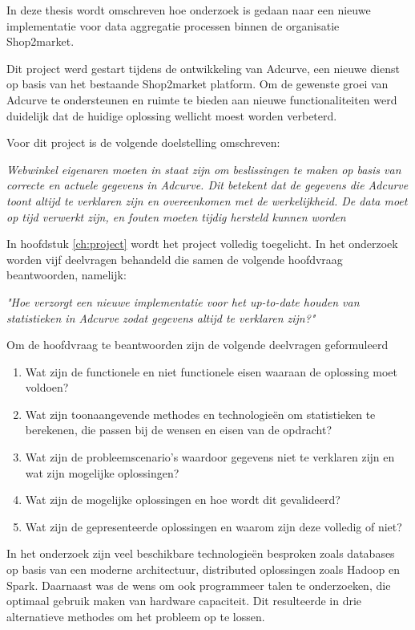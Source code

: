 
In deze thesis wordt omschreven hoe onderzoek is gedaan naar een nieuwe implementatie voor data aggregatie processen binnen de organisatie Shop2market.

Dit project werd gestart tijdens de ontwikkeling van Adcurve, een nieuwe dienst op basis van het bestaande Shop2market platform. Om de gewenste groei van Adcurve te ondersteunen en ruimte te bieden aan nieuwe functionaliteiten werd duidelijk dat de huidige oplossing wellicht moest worden verbeterd.

Voor dit project is de volgende doelstelling omschreven:

\textit{Webwinkel eigenaren moeten in staat zijn om beslissingen te maken op basis van correcte en actuele gegevens in Adcurve. Dit betekent dat de gegevens die Adcurve toont altijd te verklaren zijn en overeenkomen met de werkelijkheid. De data moet op tijd verwerkt zijn, en fouten moeten tijdig hersteld kunnen worden}


In hoofdstuk \ref{ch:project} wordt het project volledig toegelicht. In het onderzoek worden vijf deelvragen behandeld die samen de volgende hoofdvraag beantwoorden, namelijk:

\medskip
{\large \textit{"Hoe verzorgt een nieuwe implementatie voor het up-to-date houden van statistieken in Adcurve zodat gegevens altijd te verklaren zijn?"}}
\medskip

Om de hoofdvraag te beantwoorden zijn de volgende deelvragen geformuleerd

\begin{enumerate}
\item Wat zijn de functionele en niet functionele eisen waaraan de oplossing moet voldoen?
\item Wat zijn toonaangevende methodes en technologieën om statistieken te berekenen, die passen bij de wensen en eisen van de opdracht?
\item Wat zijn de probleemscenario's waardoor gegevens niet te verklaren zijn en wat zijn mogelijke oplossingen?
\item Wat zijn de mogelijke oplossingen en hoe wordt dit gevalideerd?
\item Wat zijn de gepresenteerde oplossingen en waarom zijn deze volledig of niet?
\end{enumerate}


In het onderzoek zijn veel beschikbare technologieën besproken zoals databases op basis van een moderne architectuur, distributed oplossingen zoals Hadoop en Spark. Daarnaast was de wens om ook programmeer talen te onderzoeken, die optimaal gebruik maken van hardware capaciteit. Dit resulteerde in drie alternatieve methodes om het probleem op te lossen.

